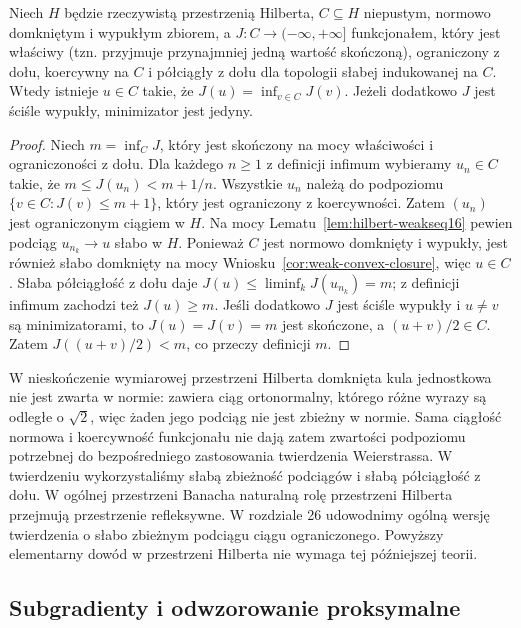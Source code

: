 \begin{twierdzenie}
\label{thm:direct-method16}
Niech $H$ będzie rzeczywistą przestrzenią Hilberta,
$C\subseteq H$ niepustym, normowo domkniętym i wypukłym
zbiorem, a $J:C\to(-\infty,+\infty]$ funkcjonałem,
który jest właściwy (tzn. przyjmuje przynajmniej jedną
wartość skończoną), ograniczony z dołu, koercywny na $C$
i półciągły z dołu dla topologii słabej indukowanej na $C$.
Wtedy istnieje $u\in C$ takie, że
$J(u)=\inf_{v\in C}J(v)$.
Jeżeli dodatkowo $J$ jest ściśle wypukły,
minimizator jest jedyny.
\end{twierdzenie}
\begin{proof}
Niech $m=\inf_C J$, który jest skończony na mocy
właściwości i ograniczoności z dołu. Dla każdego $n\ge1$ z definicji infimum wybieramy
$u_n\in C$ takie, że $m\le J(u_n)<m+1/n$.
Wszystkie $u_n$ należą do podpoziomu $\{v\in C:J(v)\le m+1\}$,
który jest ograniczony z koercywności. Zatem
$(u_n)$ jest ograniczonym ciągiem w $H$.
Na mocy Lematu~\ref{lem:hilbert-weakseq16}
pewien podciąg $u_{n_k}\to u$ słabo w $H$.
Ponieważ $C$ jest normowo domknięty i wypukły,
jest również słabo domknięty na mocy
Wniosku~\ref{cor:weak-convex-closure}, więc $u\in C$.
Słaba półciągłość z dołu daje
$J(u)\le\liminf_k J(u_{n_k})=m$; z definicji infimum
zachodzi też $J(u)\ge m$. Jeśli dodatkowo $J$ jest
ściśle wypukły i $u\ne v$ są minimizatorami, to
$J(u)=J(v)=m$ jest skończone, a $(u+v)/2\in C$.
Zatem $J((u+v)/2)<m$, co przeczy definicji $m$.
\end{proof}

\begin{uwaga}
\label{rem:coercive16}
W nieskończenie wymiarowej przestrzeni Hilberta
domknięta kula jednostkowa nie jest zwarta w normie:
zawiera ciąg ortonormalny, którego różne wyrazy
są odległe o $\sqrt2$, więc żaden jego podciąg
nie jest zbieżny w normie.
Sama ciągłość normowa i koercywność funkcjonału
nie dają zatem zwartości podpoziomu potrzebnej
do bezpośredniego zastosowania twierdzenia Weierstrassa. W twierdzeniu wykorzystaliśmy
słabą zbieżność podciągów i słabą półciągłość z dołu.
W ogólnej przestrzeni Banacha naturalną rolę przestrzeni
Hilberta przejmują przestrzenie refleksywne.
W rozdziale 26 udowodnimy ogólną wersję twierdzenia
o słabo zbieżnym podciągu ciągu ograniczonego.
Powyższy elementarny dowód w przestrzeni Hilberta
nie wymaga tej późniejszej teorii.
\end{uwaga}

\subsection{Subgradienty i odwzorowanie proksymalne}

